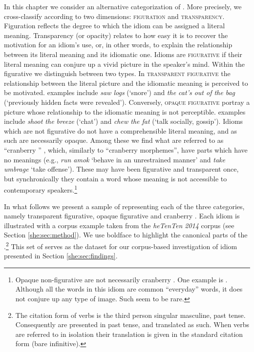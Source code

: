\documentclass[output=paper]{langsci/langscibook}
\begin{document}
In this chapter we consider an alternative categorization of . More precisely, we cross-classify  according to two dimensions: {\scshape figuration} and {\scshape transparency}. Figuration reflects the degree to which the idiom can be assigned a literal meaning. Transparency (or opacity) relates to how easy it is to recover the motivation for an idiom's use, or, in other words, to explain the relationship between its literal meaning and its idiomatic one. Idioms are {\scshape figurative} if their literal meaning can conjure up a vivid picture in the speaker's mind. Within the figurative  we distinguish between two types. In {\scshape transparent figurative}  the relationship between the literal picture and the idiomatic meaning is perceived to be motivated.  examples include \textit{saw logs} (`snore') and \textit{the cat's out of the bag} (`previously hidden facts were revealed'). Conversely, {\scshape opaque figurative}  portray a picture whose relationship to the idiomatic meaning is not perceptible.  examples include \textit{shoot the breeze} (`chat') and \textit{chew the fat} (`talk socially, gossip'). Idioms which are not figurative do not have a comprehensible literal meaning, and as such are necessarily opaque. Among these  we find what are referred to as ``cranberry '' \citep{moon98,trawinskisailersoehnetal.2008}, which, similarly to ``cranberry morphemes'', have parts which have no meanings (e.g., \textit{run amok} `behave in an unrestrained manner' and \textit{take umbrage} `take offense'). These  may have been figurative and transparent once, but synchronically they contain a word whose meaning is not accessible to contemporary speakers.\footnote{Opaque non-figurative  are not necessarily cranberry . One  example is . Although all the words in this idiom are common ``everyday'' words, it does not conjure up any type of image. Such  seem to be rare.}

In what follows we present a sample of   representing each of the three categories, namely transparent figurative, opaque figurative and cranberry . Each idiom is illustrated with a corpus example taken from the \emph{heTenTen 2014} corpus (see Section \ref{she:sec:method}). We use boldface to highlight the canonical parts of the .\footnote{The citation form of  verbs is the third person singular masculine,
past tense. Consequently  are presented in past tense, and translated as such. When verbs are referred to in isolation their translation is given in the standard  citation form (bare infinitive).} This set of  serves as the dataset for our corpus-based investigation of idiom  presented in Section \ref{she:sec:findings}.
\end{document}

